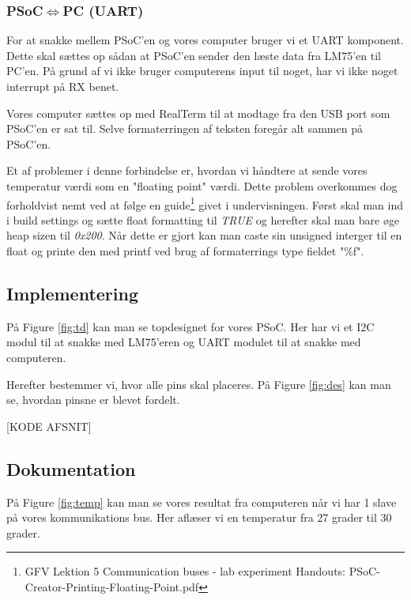 \documentclass[../main.tex]{subfiles}
\begin{document}
\subsubsection{PSoC$\iff$PC (UART)}
For at snakke mellem PSoC'en og vores computer bruger vi et UART komponent. Dette skal sættes op sådan at PSoC'en sender den læste data fra LM75'en til PC'en.
På grund af vi ikke bruger computerens input til noget, har vi ikke noget interrupt på RX benet.

Vores computer sættes op med RealTerm til at modtage fra den USB port som PSoC'en er sat til.
Selve formaterringen af teksten foregår alt sammen på PSoC'en.

Et af problemer i denne forbindelse er, hvordan vi håndtere at sende vores temperatur værdi som en "floating point" værdi.
Dette problem overkommes dog forholdvist nemt ved at følge en guide\footnote{GFV Lektion 5 Communication buses - lab experiment Handouts: PSoC-Creator-Printing-Floating-Point.pdf} givet i undervisningen.
Først skal man ind i build settings og sætte float formatting til \textit{TRUE} og herefter skal man bare øge heap sizen til \textit{0x200}.
Når dette er gjort kan man caste sin unsigned interger til en float og printe den med printf ved brug af formaterrings type fieldet "\%f".

\subsection{Implementering}
På Figure \ref{fig:td} kan man se topdesignet for vores PSoC. Her har vi et I2C modul til at snakke med LM75'eren og UART modulet til at snakke med computeren.


Herefter bestemmer vi, hvor alle pins skal placeres. På Figure \ref{fig:des} kan man se, hvordan pinsne er blevet fordelt.


[KODE AFSNIT]

\subsection{Dokumentation}

På Figure \ref{fig:temp} kan man se vores resultat fra computeren når vi har 1 slave på vores kommunikations bus. Her aflæser vi en temperatur fra 27 grader til 30 grader.
\end{document}
